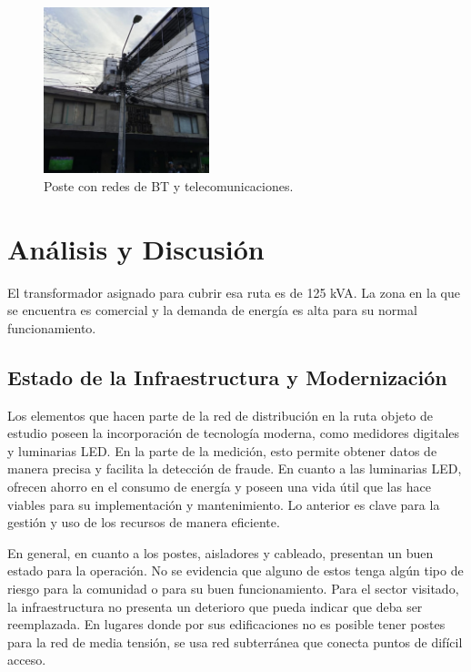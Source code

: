 \begin{figure}[H]
    \centering
    \includegraphics[width=0.43\textwidth, height=0.43\textwidth]{fig_/7}
    \caption{Poste con redes de BT y telecomunicaciones.}
    \label{fig:poste_telecom}
\end{figure} %

\section{Análisis y Discusión}

El transformador asignado para cubrir esa ruta es de 125 kVA. La zona en la que se encuentra es comercial y la demanda de energía es alta para su normal funcionamiento.

\subsection{Estado de la Infraestructura y Modernización}
Los elementos que hacen parte de la red de distribución en la ruta objeto de estudio poseen la incorporación de tecnología moderna, como medidores digitales y luminarias LED. En la parte de la medición, esto permite obtener datos de manera precisa y facilita la detección de fraude. En cuanto a las luminarias LED, ofrecen ahorro en el consumo de energía y poseen una vida útil que las hace viables para su implementación y mantenimiento. Lo anterior es clave para la gestión y uso de los recursos de manera eficiente.

En general, en cuanto a los postes, aisladores y cableado, presentan un buen estado para la operación. No se evidencia que alguno de estos tenga algún tipo de riesgo para la comunidad o para su buen funcionamiento. Para el sector visitado, la infraestructura no presenta un deterioro que pueda indicar que deba ser reemplazada. En lugares donde por sus edificaciones no es posible tener postes para la red de media tensión, se usa red subterránea que conecta puntos de difícil acceso.

